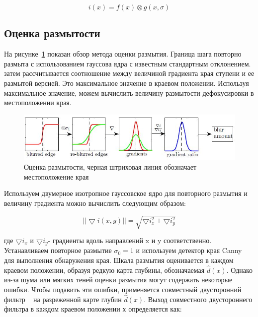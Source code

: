\begin{equation}\label{eq:3}
i(x)=f(x)\otimes g(x,\sigma)
\end{equation}

\subsection{Оценка размытости}

На рисунке~\ref{fig:blur} показан обзор метода оценки размытия. Граница шага повторно размыта с использованием гауссова ядра с известным стандартным отклонением. затем рассчитывается соотношение между величиной градиента края ступени и ее размытой версией. Это максимальное значение в краевом положении. Используя максимальное значение, можем вычислить величину размытости дефокусировки в местоположении края.

\begin{figure}[H]
	\centering
	\includegraphics[width=1\linewidth]{pics/blur}
	\caption{Оценка размытости, черная штриховая линия обозначает местоположение края}
	\label{fig:blur}
\end{figure}

Используем двумерное изотропное гауссовское ядро для повторного размытия и величину градиента можно вычислить следующим образом:

\begin{equation}\label{eq:4}
||\bigtriangledown i(x,y)||=\sqrt{\bigtriangledown i_x^2+\bigtriangledown i_y^2}
\end{equation}

где $\bigtriangledown i_x$ и $\bigtriangledown i_y$- градиенты вдоль направлений x и y соответственно. Устанавливаем повторное размытие $\sigma_0=1$ и используем детектор края Canny ~\cite{IEEE} для выполнения обнаружения края.
Шкала размытия оценивается в каждом краевом положении, образуя редкую
карта глубины, обозначаемая $\hat{d}(x)$. Однако из-за шума или мягких теней оценки размытия могут содержать некоторые ошибки. Чтобы подавить эти ошибки, применяется совместный двусторонний фильтр ~\cite{ACM} на разреженной карте глубин $\hat{d}(x)$. Выход совместного двустороннего фильтра в каждом краевом положении х определяется как:

